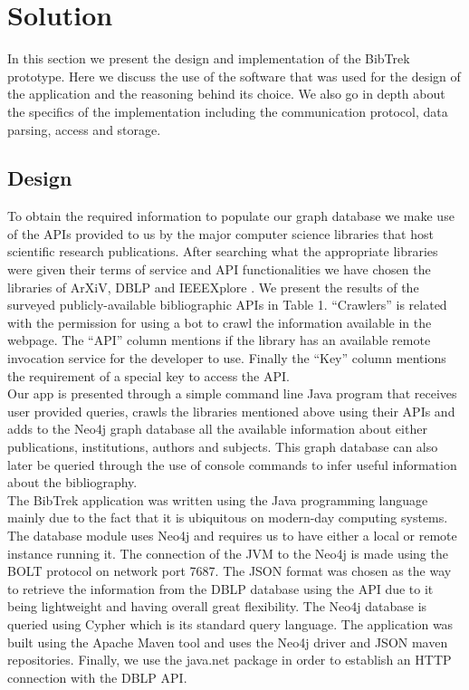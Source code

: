 \documentclass[twocolumn]{article}
\begin{document}
\section{Solution}

In this section we present the design and implementation of the BibTrek prototype. Here we discuss the use of the software that was used for the design of the application and the reasoning behind its choice. We also go in depth about the specifics of the implementation including the communication protocol, data parsing, access and storage.

\subsection{Design}
To obtain the required information to populate our graph database we make use of the APIs provided to us by the major computer science libraries that host scientific research publications. After searching what the appropriate libraries were given their terms of service and API functionalities we have chosen the libraries of ArXiV, DBLP and IEEEXplore \cite{arxiv, dblp, ieeexplore}. We present the results of the surveyed publicly-available bibliographic APIs in Table 1. ``Crawlers'' is related with the permission for using a bot to crawl the information available in the webpage. The ``API'' column mentions if the library has an available remote invocation service for the developer to use. Finally the ``Key'' column mentions the requirement of a special key to access the API. \\[1\baselineskip]
Our app is presented through a simple command line Java program that receives user provided queries, crawls the libraries mentioned above using their APIs and adds to the Neo4j\cite{neo4j} graph database all the available information about either publications, institutions, authors and subjects. This graph database can also later be queried through the use of console commands to infer useful information about the bibliography.\\[1\baselineskip]
The BibTrek application was written using the Java programming language mainly due to the fact that it is ubiquitous on modern-day computing systems. The database module uses Neo4j and requires us to have either a local or remote instance running it. The connection of the JVM to the Neo4j is made using the BOLT protocol on network port 7687. The JSON format was chosen as the way to retrieve the information from the DBLP database using the API due to it being lightweight and having overall great flexibility. The Neo4j database is queried using Cypher\cite{cypher} which is its standard query language. The application was built using the Apache Maven tool and uses the Neo4j driver and JSON maven repositories. Finally, we use the java.net package in order to establish an HTTP connection with the DBLP API.
\end{document}
